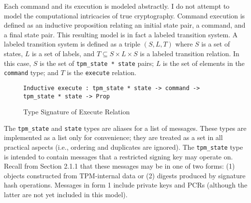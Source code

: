 Each command and its execution is modeled abstractly. I do not attempt to model the computational intricacies of true cryptography. Command execution is defined as an inductive proposition relating an initial state pair, a command, and a final state pair. This resulting model is in fact a labeled transition system. A labeled transition system is defined as a triple $(S,L,T)$ where $S$ is a set of states, $L$ is a set of labels, and $T \subseteq S \times L \times S$ is a labeled transition relation. In this case, $S$ is the set of \verb|tpm_state * state| pairs; $L$ is the set of elements in the \verb|command| type; and $T$ is the \verb|execute| relation.
\begin{figure}[h]
\begin{lstlisting}[language=Coq]
Inductive execute : tpm_state * state -> command -> tpm_state * state -> Prop
\end{lstlisting}
\caption{Type Signature of Execute Relation}
\end{figure}
The \verb|tpm_state| and \verb|state| types are aliases for a list of messages. These types are implemented as a list only for convenience; they are treated as a set in all practical aspects (i.e., ordering and duplicates are ignored). The \verb|tpm_state| type is intended to contain messages that a restricted signing key may operate on. Recall from Section 2.1.1 that these messages may be in one of two forms: (1) objects constructed from TPM-internal data or (2) digests produced by signature hash operations. Messages in form 1 include private keys and PCRs (although the latter are not yet included in this model). 

